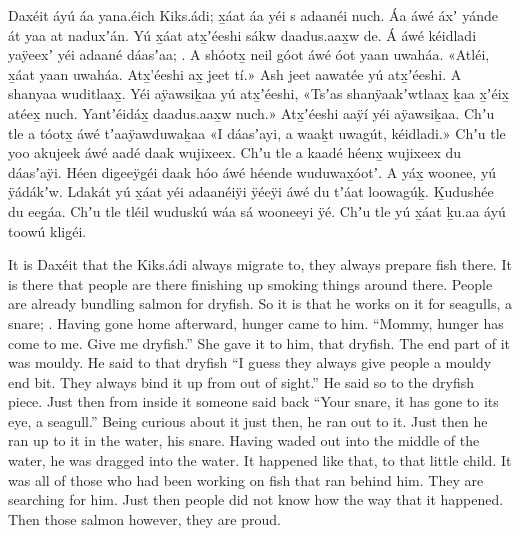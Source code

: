 \begin{pairs}
\begin{Leftside}
\beginnumbering
\pstart\noindent
{}Daxéit áyú áa yana.éich Kiks.ádi;
x̱áat áa yéi s adaanéi nuch.
Áa áwé áxʼ yánde át yaa at naduxʼán.
Yú x̱áat atx̱ʼéeshi sákw daadus.aax̱w de.
Á áwé kéidladi yaÿeexʼ yéi adaané dáasʼaa;
.
A shóotx̱ neil góot áwé óot yaan uwaháa.
«\!Atléi, x̱áat yaan uwaháa.
Atx̱'éeshi ax̱ jeet tí.\!»
Ash jeet aawatée yú atx̱ʼéeshi.
A shanyaa wuditlaax̱.
Yéi aÿawsiḵaa yú atx̱ʼéeshi,
«\!Tsʼas shanÿaakʼw\-tlaax̱ ḵaa x̱ʼéix̱ atéex̱ nuch.
Yantʼéidáx̱ daadus.aax̱w nuch.\!»
Atx̱ʼéeshi aaÿí yéi aÿawsiḵaa.
Chʼu tle a tóotx̱ áwé tʼaaÿawduwaḵaa
«\!I dáasʼayi, a waaḵt uwagút, kéidladi.\!»
Chʼu tle yoo akujeek áwé aadé daak wujixeex.
Chʼu tle a kaadé héenx̱ wujixeex du dáasʼaÿi.
Héen digeeÿgéi daak hóo áwé héende wuduwax̱óotʼ.
A yáx̱ woonee, yú ÿádákʼw.
Ldakát yú x̱áat yéi adaanéiÿi ÿéeÿi áwé du tʼáat loowagúḵ.
Ḵudushée du eeg̱áa.
Chʼu tle tléil wuduskú wáa sá wooneeyi ÿé.
\pend
\pstart
{}Chʼu tle yú x̱áat ḵu.aa áyú toowú klig̱éi.
\pend
\endnumbering
\end{Leftside}
\begin{Rightside}
\beginnumbering
\pstart\noindent
{}It is Daxéit that the Kiks.ádi always migrate to,
they always prepare fish there.
It is there that people are there finishing up smoking things around there.
People are already bundling salmon for dryfish.
So it is that he works on it for seagulls, a snare;
.
Having gone home afterward, hunger came to him.
\qqk{}“Mommy, hunger has come to me.
Give me dryfish.”
She gave it to him, that dryfish.
The end part of it was mouldy.
He said to that dryfish
\qqk{}“I guess they always give people a mouldy end bit.
They always bind it up from out of sight.”
He said so to the dryfish piece.
\!Just then from inside it someone said back
“Your snare, it has gone to its eye, a seagull.”
Being curious about it just then, he ran out to it.
Just then he ran up to it in the water, his snare.
Having waded out into the middle of the water, he was dragged into the water.
It happened like that, to that little child.
It was all of those who had been working on fish that ran behind him.
They are searching for him.
Just then people did not know how the way that it happened.
\pend
\pstart
{}Then those salmon however, they are proud.
\pend
\endnumbering
\end{Rightside}
\end{pairs}
\Columns

